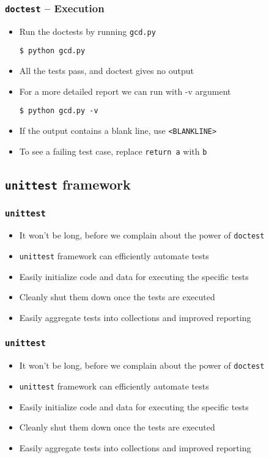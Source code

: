 \documentclass[12pt,presentation]{beamer}
\begin{document}
\begin{frame}[fragile]
  \frametitle{\texttt{doctest} -- Execution}
  \begin{itemize}
  \item Run the doctests by running \texttt{gcd.py}
\begin{lstlisting}
$ python gcd.py
\end{lstlisting} %
  \item All the tests pass, and doctest gives no output
  \item For a more detailed report we can run with -v argument
\begin{lstlisting}
$ python gcd.py -v
\end{lstlisting} %
  \item If the output contains a blank line, use \texttt{<BLANKLINE>}
  \item To see a failing test case, replace \texttt{return a} with \texttt{b}
  \end{itemize}
\end{frame}

\subsection{\texttt{unittest} framework}

\begin{frame}[fragile]
  \frametitle{\texttt{unittest}}
  \begin{itemize}
  \item It won't be long, before we complain about the power of
    \texttt{doctest} 
  \item \texttt{unittest} framework can efficiently automate tests
  \item Easily initialize code and data for executing the specific
    tests
  \item Cleanly shut them down once the tests are executed
  \item Easily aggregate tests into collections and improved reporting
  \end{itemize}
\end{frame}


\begin{frame}[fragile]
  \frametitle{\texttt{unittest}}
  \begin{itemize}
  \item It won't be long, before we complain about the power of
    \texttt{doctest} 
  \item \texttt{unittest} framework can efficiently automate tests
  \item Easily initialize code and data for executing the specific
    tests
  \item Cleanly shut them down once the tests are executed
  \item Easily aggregate tests into collections and improved reporting
  \end{itemize}
\end{frame}
\end{document}
